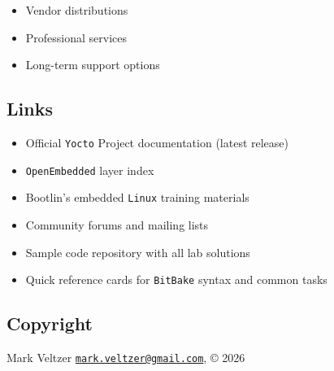 \documentclass[
]{article}
\providecommand{\tightlist}{%
  \setlength{\itemsep}{0pt}\setlength{\parskip}{0pt}}
\begin{document}
\begin{itemize}
\begin{itemize}
\begin{itemize}
      \begin{itemize}
      \tightlist
      \item
        Vendor distributions
      \item
        Professional services
      \item
        Long-term support options
      \end{itemize}
    \end{itemize}
  \end{itemize}
\end{itemize}

\subsection{Links}\label{links}

\begin{itemize}
\tightlist
\item
  Official \texttt{Yocto} Project documentation (latest release)
\item
  \texttt{OpenEmbedded} layer index
\item
  Bootlin's embedded \texttt{Linux} training materials
\item
  Community forums and mailing lists
\item
  Sample code repository with all lab solutions
\item
  Quick reference cards for \texttt{BitBake} syntax and common tasks
\end{itemize}

\subsection{Copyright}\label{copyright}

Mark Veltzer
\href{mailto:mark.veltzer@gmail.com}{\nolinkurl{mark.veltzer@gmail.com}},
© 2026
\end{document}
